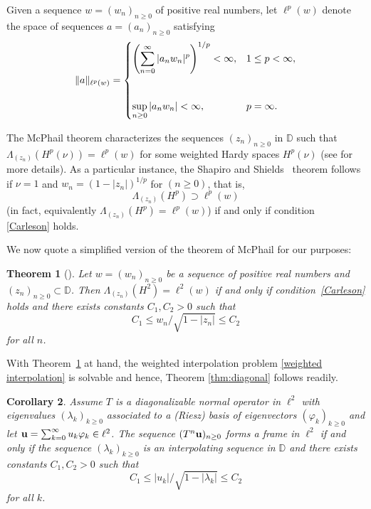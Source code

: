 \documentclass[11pt]{amsart}
\newtheorem{thm}{Theorem}[section]
\newtheorem{cor}[thm]{Corollary}
\theoremstyle{definition}
\theoremstyle{remark}
\numberwithin{equation}{section}
\def\DD{{\mathbb D}}
\def\phi{\varphi}
\newcommand{\uu}{\textnormal{\textbf{u}} }
\begin{document}
{\medskip

Given a sequence $w =(w_n)_{n\geq 0}$ of positive real numbers, let
$\ell^p(w)$ denote the space of sequences $a = (a_n)_{n\geq 0}$ satisfying
\begin{equation}
\|a\|_{\ell^p(w)} =
\begin{cases}
\displaystyle
\left( \sum_{n=0}^\infty |a_n w_n|^p \right)^{1/p} < \infty,
& 1 \le p < \infty, \\
\noalign{\smallskip} \\[8pt]
\displaystyle
\sup_{n \ge 0} |a_n w_n| < \infty,
& p = \infty.
\end{cases}
\end{equation}

The McPhail theorem characterizes the sequences $(z_n)_{n\geq 0}$ in $\mathbb{D}$ such that
$\Lambda_{(z_n)} (H^p(\nu)) = \ell^p(w)$ for some weighted Hardy spaces $H^p(\nu)$ (see \cite{mcphail} for more details).
As a particular instance, the Shapiro and Shields~\cite{ShapiroShields} theorem follows if $\nu = 1$ and $w_n = (1 - |z_n|)^{1/p}$ for  $(n \ge 0)$, that is,
\[
\Lambda_{(z_n)}(H^p) \supset \ell^p(w)
\]
(in fact, equivalently $\Lambda_{(z_n)}(H^p) = \ell^p(w)$) if and only if condition~ \eqref{Carleson} holds.

\smallskip

We now quote a simplified version of the theorem of McPhail \cite{mcphail} for our purposes:



\begin{thm}[\cite{mcphail}]\label{thm:mcphail}
Let $w =(w_n)_{n\geq 0}$ be a sequence of positive real numbers and $(z_n)_{n\geq 0}\subset \mathbb{D}$. Then
$\Lambda_{(z_n)}(H^2) = \ell^2(w)$ if and only if   condition~\eqref{Carleson} holds and there exists constants
$C_1, C_2 > 0$ such that
\[
C_1 \le w_n/\sqrt{1-|z_n|} \le C_2
\]
for all $n$.
\end{thm}

With Theorem~\ref{thm:mcphail} at hand, the weighted interpolation problem \eqref{weighted interpolation} is solvable and hence, Theorem \ref{thm:diagonal} follows readily.


\begin{cor}
Assume $T$ is a diagonalizable normal operator in $\ell^2$  with eigenvalues $(\lambda_k)_{k \ge 0}$ associated to a (Riesz) basis of eigenvectors $(\phi_k)_{k \ge 0}$ and let $\uu=\sum_{k=0}^\infty u_k \phi_k \in \ell^2$. The sequence $(T^n \uu)_{n\geq 0}$ forms a frame in $\ell^2$ if and only if the sequence $(\lambda_k)_{k \ge 0}$ is an interpolating sequence in $\DD$ and there exists constants $C_1, C_2 > 0$ such that
\[
C_1 \le |u_k|/\sqrt{1-|\lambda_k|}
\le C_2
\]
for all $k$.
\end{cor}

}
\end{document}

